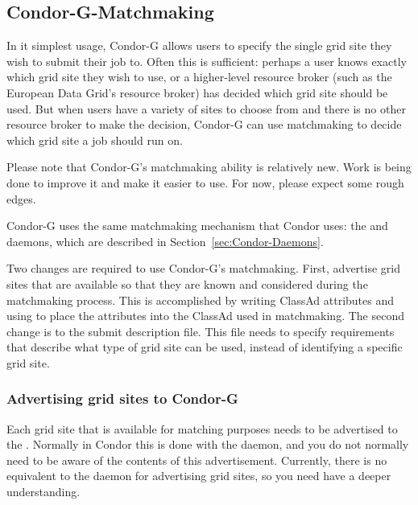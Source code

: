 \subsection{\label{sec:Condor-G-Matchmaking}Condor-G-Matchmaking}

In it simplest usage, Condor-G allows users to specify the single
grid site they wish to submit their job to.
Often this is sufficient: perhaps a user knows exactly which
grid site they wish to use,
or a higher-level resource broker
(such as the European Data Grid's resource broker)
has decided which grid site should be used.
But when users have a variety of sites to choose from and there
is no other resource broker to make the decision, Condor-G can use
matchmaking to decide which grid site a job should run on. 

Please note that Condor-G's matchmaking ability is relatively
new. Work is being done to improve it and make it easier to use. For
now, please expect some rough edges. 

Condor-G uses the same matchmaking mechanism that Condor uses: the
 and  daemons, which are described in
Section~\ref{sec:Condor-Daemons}. 

Two changes are required to use Condor-G's matchmaking.
First,
advertise grid sites that are available so that they are
known and considered during the matchmaking process.
This is accomplished by writing ClassAd attributes and
using  to place the attributes into the
ClassAd used in matchmaking.
The second change is to the
submit description file.
This file needs to specify requirements that describe what
type of grid site can be used, instead of identifying a specific grid site.


\subsubsection{Advertising grid sites to Condor-G}

Each grid site that is available for matching purposes needs to be
advertised to the . Normally in Condor this is done
with the  daemon, and you do not normally need to be
aware of the contents of this advertisement. Currently, there is no
equivalent to the  daemon for advertising grid sites,
so you need have a deeper understanding. 

